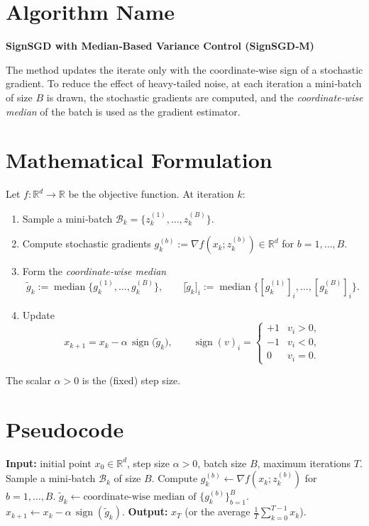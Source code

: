 \documentclass{article}
\newcommand{\sign}{\operatorname{sign}}
\newcommand{\RR}{\mathbb{R}}
\begin{document}
\section*{Algorithm Name}
\textbf{SignSGD with Median‑Based Variance Control (SignSGD‑M)}  

The method updates the iterate only with the coordinate‑wise sign of a stochastic gradient.  
To reduce the effect of heavy‑tailed noise, at each iteration a mini‑batch of size $B$ is drawn,
the stochastic gradients are computed, and the \emph{coordinate‑wise median} of the batch is used as the
gradient estimator.

\section*{Mathematical Formulation}
Let $f:\RR^{d}\!\to\!\RR$ be the objective function.  
At iteration $k$:

\begin{enumerate}[label=(\roman*)]
\item Sample a mini‑batch $\mathcal{B}_{k}=\{z_{k}^{(1)},\dots ,z_{k}^{(B)}\}$.
\item Compute stochastic gradients $g_{k}^{(b)}:=\nabla f(x_{k};z_{k}^{(b)})\in\RR^{d}$ for $b=1,\dots ,B$.
\item Form the \emph{coordinate‑wise median}  
\[
\tilde{g}_{k}:=\operatorname{median}\bigl\{g_{k}^{(1)},\dots ,g_{k}^{(B)}\bigr\},
\qquad 
\bigl[\tilde{g}_{k}\bigr]_{i}:=\operatorname{median}\bigl\{[g_{k}^{(1)}]_{i},\dots ,[g_{k}^{(B)}]_{i}\bigr\}.
\]
\item Update
\[
x_{k+1}=x_{k}-\alpha\,\sign\!\bigl(\tilde{g}_{k}\bigr),\qquad 
\sign(v)_{i}= \begin{cases}
+1 & v_{i}>0,\\
-1 & v_{i}<0,\\
0 & v_{i}=0 .
\end{cases}
\tag{1}
\]
\end{enumerate}
The scalar $\alpha>0$ is the (fixed) step size.

\section*{Pseudocode}
\begin{algorithm}[H]
\caption{SignSGD‑M}
\begin{algorithmic}[1]
\State \textbf{Input:} initial point $x_{0}\in\RR^{d}$, step size $\alpha>0$, batch size $B$,
maximum iterations $T$.
    \State Sample a mini‑batch $\mathcal{B}_{k}$ of size $B$.
    \State Compute $g_{k}^{(b)}\gets \nabla f(x_{k};z_{k}^{(b)})$ for $b=1,\dots ,B$.
    \State $\tilde g_{k}\gets \text{coordinate‑wise median of }\{g_{k}^{(b)}\}_{b=1}^{B}$.
    \State $x_{k+1}\gets x_{k}-\alpha\,\sign(\tilde g_{k})$.
\EndFor
\State \textbf{Output:} $x_{T}$ (or the average $\frac1T\sum_{k=0}^{T-1}x_{k}$).
\end{algorithmic}
\end{algorithm}
\end{document}
